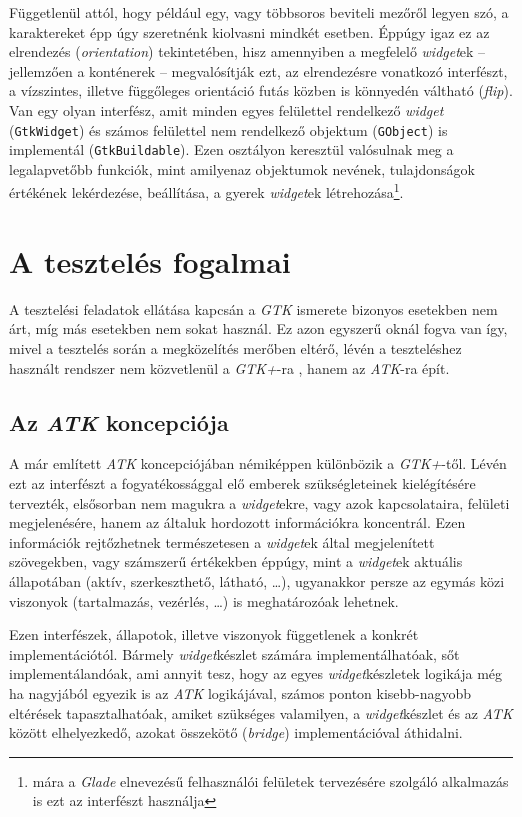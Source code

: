 Függetlenül attól, hogy például egy, vagy többsoros beviteli mezőről legyen szó, a karaktereket épp úgy szeretnénk kiolvasni mindkét esetben. Éppúgy igaz ez az elrendezés (\textit{orientation}) tekintetében, hisz amennyiben a megfelelő \textit{widget}ek -- jellemzően a konténerek -- megvalósítják ezt, az elrendezésre vonatkozó interfészt, a vízszintes, illetve függőleges orientáció futás közben is könnyedén váltható (\textit{flip}). Van egy olyan interfész, amit minden egyes felülettel rendelkező \textit{widget} (\texttt{GtkWidget}) és számos felülettel nem rendelkező objektum (\texttt{GObject}) is implementál (\texttt{GtkBuildable}). Ezen osztályon keresztül valósulnak meg a legalapvetőbb funkciók, mint amilyenaz objektumok nevének, tulajdonságok értékének lekérdezése, beállítása, a gyerek \textit{widget}ek létrehozása\footnote{mára a \textit{Glade} elnevezésű felhasználói felületek tervezésére szolgáló alkalmazás is ezt az interfészt használja}.

\section{A tesztelés fogalmai}

A tesztelési feladatok ellátása kapcsán a \textit{GTK} ismerete bizonyos esetekben nem árt, míg más esetekben nem sokat használ. Ez azon egyszerű oknál fogva van így, mivel a tesztelés során a megközelítés merőben eltérő, lévén a teszteléshez használt rendszer nem közvetlenül a \textit{GTK+}-ra , hanem az \textit{ATK}-ra épít.

\subsection{Az \textit{ATK} koncepciója}

A már említett \textit{ATK} koncepciójában némiképpen különbözik a \textit{GTK+}-től. Lévén ezt az interfészt a fogyatékossággal elő emberek szükségleteinek kielégítésére tervezték, elsősorban nem magukra a \textit{widget}ekre, vagy azok kapcsolataira, felületi megjelenésére, hanem az általuk hordozott információkra koncentrál. Ezen információk rejtőzhetnek természetesen a \textit{widget}ek által megjelenített szövegekben, vagy számszerű értékekben éppúgy, mint a \textit{widget}ek aktuális állapotában (aktív, szerkeszthető, látható, \dots), ugyanakkor persze az egymás közi viszonyok (tartalmazás, vezérlés, \dots) is meghatározóak lehetnek.

Ezen interfészek, állapotok, illetve viszonyok függetlenek a konkrét implementációtól. Bármely \textit{widget}készlet számára implementálhatóak, sőt implementálandóak, ami annyit tesz, hogy az egyes \textit{widget}készletek logikája még ha nagyjából egyezik is az \textit{ATK} logikájával, számos ponton kisebb-nagyobb eltérések tapasztalhatóak, amiket szükséges valamilyen, a \textit{widget}készlet és az \textit{ATK} között elhelyezkedő, azokat összekötő (\textit{bridge}) implementációval áthidalni.


